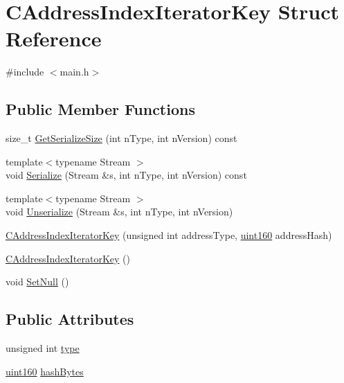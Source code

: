 \hypertarget{struct_c_address_index_iterator_key}{}\section{C\+Address\+Index\+Iterator\+Key Struct Reference}
\label{struct_c_address_index_iterator_key}


{\ttfamily \#include $<$main.\+h$>$}

\subsection*{Public Member Functions}
\begin{DoxyCompactItemize}
\item 
size\+\_\+t \mbox{\hyperlink{struct_c_address_index_iterator_key_a23384b0e7ea8a49351ff2cc8edf05e74}{Get\+Serialize\+Size}} (int n\+Type, int n\+Version) const
\item 
{\footnotesize template$<$typename Stream $>$ }\\void \mbox{\hyperlink{struct_c_address_index_iterator_key_afaf32e972faab532e967f6014a52b36a}{Serialize}} (Stream \&s, int n\+Type, int n\+Version) const
\item 
{\footnotesize template$<$typename Stream $>$ }\\void \mbox{\hyperlink{struct_c_address_index_iterator_key_a84d1014fb8b3d80e1a3f10f400a11342}{Unserialize}} (Stream \&s, int n\+Type, int n\+Version)
\item 
\mbox{\hyperlink{struct_c_address_index_iterator_key_a9d4cf4cfc5f18e0f64b32712f74295eb}{C\+Address\+Index\+Iterator\+Key}} (unsigned int address\+Type, \mbox{\hyperlink{classuint160}{uint160}} address\+Hash)
\item 
\mbox{\hyperlink{struct_c_address_index_iterator_key_aa3a82dee2b5dc382f1a913907fa95c91}{C\+Address\+Index\+Iterator\+Key}} ()
\item 
void \mbox{\hyperlink{struct_c_address_index_iterator_key_a3e6b1016da4915e6fdb50d501ff4f628}{Set\+Null}} ()
\end{DoxyCompactItemize}
\subsection*{Public Attributes}
\begin{DoxyCompactItemize}
\item 
unsigned int \mbox{\hyperlink{struct_c_address_index_iterator_key_af1a84c54d507561b6bc658ed82118714}{type}}
\item 
\mbox{\hyperlink{classuint160}{uint160}} \mbox{\hyperlink{struct_c_address_index_iterator_key_aab6510251daddd53107bd00bd97f7021}{hash\+Bytes}}
\end{DoxyCompactItemize}


